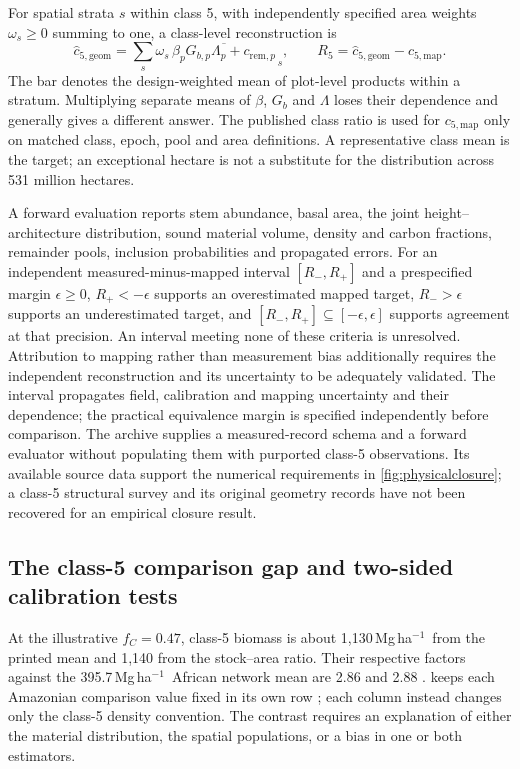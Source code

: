 \documentclass[11pt,a4paper]{article}
\theoremstyle{remark}
\begin{document}
For spatial strata $s$ within class 5, with independently specified area weights $\omega_s\geq0$ summing to one, a class-level reconstruction is
\begin{equation}
 \widehat c_{5,\mathrm{geom}}
 =\sum_s\omega_s\,\overline{\beta_pG_{b,p}\Lambda_p+c_{\mathrm{rem},p}}_{\,s},
 \qquad
 R_5=\widehat c_{5,\mathrm{geom}}-c_{5,\mathrm{map}}.
 \label{eq:classclosure}
\end{equation}
The bar denotes the design-weighted mean of plot-level products within a stratum. Multiplying separate means of $\beta$, $G_b$ and $\Lambda$ loses their dependence and generally gives a different answer. The published class ratio is used for $c_{5,\mathrm{map}}$ only on matched class, epoch, pool and area definitions. A representative class mean is the target; an exceptional hectare is not a substitute for the distribution across 531 million hectares.

A forward evaluation reports stem abundance, basal area, the joint height--architecture distribution, sound material volume, density and carbon fractions, remainder pools, inclusion probabilities and propagated errors. For an independent measured-minus-mapped interval $[R_-,R_+]$ and a prespecified margin $\epsilon\geq0$, $R_+<-\epsilon$ supports an overestimated mapped target, $R_->\epsilon$ supports an underestimated target, and $[R_-,R_+]\subseteq[-\epsilon,\epsilon]$ supports agreement at that precision. An interval meeting none of these criteria is unresolved. Attribution to mapping rather than measurement bias additionally requires the independent reconstruction and its uncertainty to be adequately validated. The interval propagates field, calibration and mapping uncertainty and their dependence; the practical equivalence margin is specified independently before comparison. The archive supplies a measured-record schema and a forward evaluator without populating them with purported class-5 observations. Its available source data support the numerical requirements in \cref{fig:physicalclosure}; a class-5 structural survey and its original geometry records have not been recovered for an empirical closure result.

\subsection{The class-5 comparison gap and two-sided calibration tests}\label{sec:comparison}
At the illustrative $f_C=0.47$, class-5 biomass is about 1,130\,Mg\,ha$^{-1}$\ from the printed mean and 1,140 from the stock--area ratio. Their respective factors against the 395.7\,Mg\,ha$^{-1}$\ African network mean are 2.86 and 2.88 \citep{Lewis2013}.  keeps each Amazonian comparison value fixed in its own row \citep{Malhi2006}; each column instead changes only the class-5 density convention. The contrast requires an explanation of either the material distribution, the spatial populations, or a bias in one or both estimators.
\end{document}
